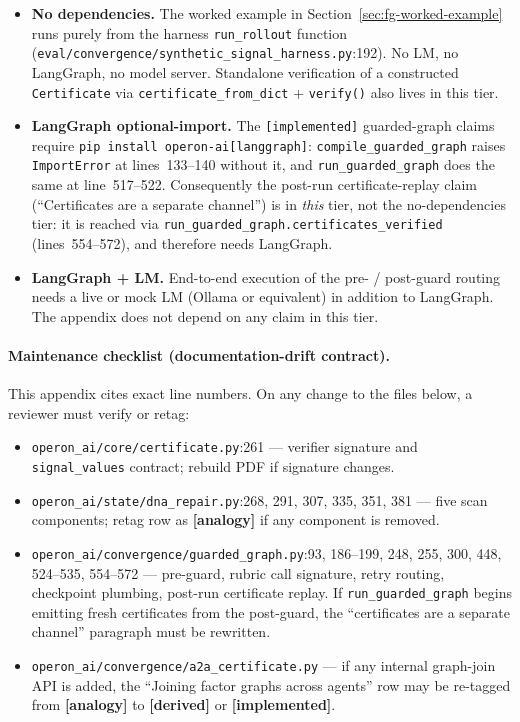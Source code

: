 \begin{itemize}[leftmargin=*,itemsep=2pt,topsep=2pt]
\item \textbf{No dependencies.} The worked example in
Section~\ref{sec:fg-worked-example} runs purely from the harness
\texttt{run\_rollout} function
(\texttt{eval/convergence/synthetic\_signal\_harness.py}:192).  No
LM, no LangGraph, no model server.  Standalone verification of a
constructed \texttt{Certificate} via
\texttt{certificate\_from\_dict} + \texttt{verify()} also lives in
this tier.
\item \textbf{LangGraph optional-import.}  The
\texttt{[implemented]} guarded-graph claims require
\texttt{pip install operon-ai[langgraph]}:
\texttt{compile\_guarded\_graph} raises
\texttt{ImportError} at lines~133--140 without it, and
\texttt{run\_guarded\_graph} does the same at line~517--522.
Consequently the post-run certificate-replay claim (``Certificates
are a separate channel'') is in \emph{this} tier, not the
no-dependencies tier: it is reached via
\texttt{run\_guarded\_graph.certificates\_verified}
(lines~554--572), and therefore needs LangGraph.
\item \textbf{LangGraph + LM.}  End-to-end execution of the pre- /
post-guard routing needs a live or mock LM (Ollama or equivalent)
in addition to LangGraph.  The appendix does not depend on any
claim in this tier.
\end{itemize}

\paragraph{Maintenance checklist (documentation-drift contract).}
This appendix cites exact line numbers.  On any change to the
files below, a reviewer must verify or retag:

\begin{itemize}[leftmargin=*,itemsep=2pt,topsep=2pt]
\item \texttt{operon\_ai/core/certificate.py}:261 ---
verifier signature and \texttt{signal\_values} contract;
rebuild PDF if signature changes.
\item \texttt{operon\_ai/state/dna\_repair.py}:268, 291, 307, 335,
351, 381 --- five scan components; retag row as
\textbf{[analogy]} if any component is removed.
\item \texttt{operon\_ai/convergence/guarded\_graph.py}:93, 186--199,
248, 255, 300, 448, 524--535, 554--572 --- pre-guard, rubric call
signature, retry routing, checkpoint plumbing, post-run certificate
replay.  If \texttt{run\_guarded\_graph} begins emitting fresh
certificates from the post-guard, the ``certificates are a separate
channel'' paragraph must be rewritten.
\item \texttt{operon\_ai/convergence/a2a\_certificate.py} --- if any
internal graph-join API is added, the ``Joining factor graphs
across agents'' row may be re-tagged from \textbf{[analogy]} to
\textbf{[derived]} or \textbf{[implemented]}.
\end{itemize}

